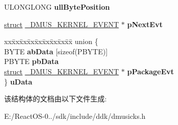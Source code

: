 \begin{DoxyCompactItemize}
U\+L\+O\+N\+G\+L\+O\+NG {\bfseries ull\+Byte\+Position}
\item 
\mbox{\label{struct___d_m_u_s___k_e_r_n_e_l___e_v_e_n_t_a30adb8ad45c1b4000c6e03be27fe4cf7}} 
\hyperlink{interfacestruct}{struct} \hyperlink{struct___d_m_u_s___k_e_r_n_e_l___e_v_e_n_t}{\+\_\+\+D\+M\+U\+S\+\_\+\+K\+E\+R\+N\+E\+L\+\_\+\+E\+V\+E\+NT} $\ast$ {\bfseries p\+Next\+Evt}
\item 
\mbox{\label{struct___d_m_u_s___k_e_r_n_e_l___e_v_e_n_t_a71cbc19f02df5070c912a328940158aa}} 
\begin{tabbing}
xx\=xx\=xx\=xx\=xx\=xx\=xx\=xx\=xx\=\kill
union \{\\
\>BYTE {\bfseries abData} \mbox{[}sizeof(PBYTE)\mbox{]}\\
\>PBYTE {\bfseries pbData}\\
\>\hyperlink{interfacestruct}{struct} \hyperlink{struct___d_m_u_s___k_e_r_n_e_l___e_v_e_n_t}{\_DMUS\_KERNEL\_EVENT} $\ast$ {\bfseries pPackageEvt}\\
\} {\bfseries uData}\\

\end{tabbing}\end{DoxyCompactItemize}


该结构体的文档由以下文件生成\+:\begin{DoxyCompactItemize}
\item 
E\+:/\+React\+O\+S-\/0../sdk/include/ddk/dmusicks.\+h\end{DoxyCompactItemize}
